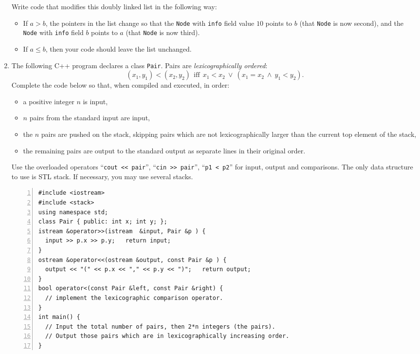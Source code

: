 \documentclass[a4paper,12pt]{article}
\begin{document}
\begin{enumerate}
Write code that modifies this doubly linked list in the following way:
\begin{itemize}
\item If $a > b$, the pointers in the list change so that the \texttt{Node} with \texttt{info} field value $10$ points to $b$ (that \texttt{Node} is now second), and the \texttt{Node} with \texttt{info} field $b$ points to $a$ (that \texttt{Node} is now third). 
\item If $a \leq b$, then your code should leave the list unchanged.
\end{itemize}

\vfill
\clearpage

\item \label{q:q4}

The following C++ program declares a class {\tt Pair}. 
Pairs are {\em lexicographically ordered}: 
\[
(x_1, y_1) < (x_2, y_2)\ \ \text{iff}\ \ x_1 < x_2\ \vee\ (x_1 = x_2\ \wedge\ y_1 < y_2).
\]
Complete the code below so that, when compiled and executed, in order:
\begin{itemize}
\item a positive integer $n$ is input,
\item $n$ pairs from the standard input are input,
\item the $n$ pairs are pushed on the stack, skipping pairs which are not lexicographically larger than the current top element of the stack,
\item the remaining pairs are output to the standard output as separate lines in their original order.
\end{itemize}

Use the overloaded operators ``{\tt cout << pair}'', ``{\tt cin >> pair}'', ``{\tt p1 < p2}''
for input, output and comparisons. The only data structure to use is STL stack. 
If necessary, you may use several stacks.

\begin{Verbatim}[frame=single,numbers=left]
#include <iostream>
#include <stack>
using namespace std;
class Pair { public: int x; int y; }; 
istream &operator>>(istream  &input, Pair &p ) { 
  input >> p.x >> p.y;   return input;            
}
ostream &operator<<(ostream &output, const Pair &p ) { 
  output << "(" << p.x << "," << p.y << ")";   return output;            
}
bool operator<(const Pair &left, const Pair &right) {
  // implement the lexicographic comparison operator.
}
int main() {
  // Input the total number of pairs, then 2*n integers (the pairs). 
  // Output those pairs which are in lexicographically increasing order.
}
\end{Verbatim}


\end{enumerate}
\end{document}
